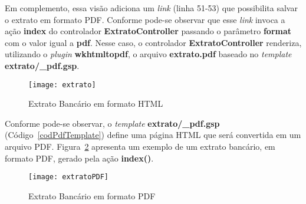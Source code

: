 \vspace{0.2cm}

\noindent Em  complemento, essa visão adiciona  um {\it link}  (linha 51-53) que
possibilita salvar o extrato em  formato PDF. Conforme pode-se observar que esse
{\it  link} invoca  a ação  {\bf index}  do controlador  {\bf ExtratoController}
passando o parâmetro {\bf format} com o  valor igual a {\bf pdf}.  Nesse caso, o
controlador {\bf  ExtratoController} renderiza,  utilizando o {\it  plugin} {\bf
  wkhtmltopdf},  o arquivo  {\bf  extrato.pdf} baseado  no  {\it template}  {\bf
  extrato/\_pdf.gsp}.

\begin{figure}[htbp]
\centering\texttt{[image: extrato]}
\caption{Extrato Bancário em formato HTML}
\label{figExtratoHTML}
\end{figure}

Conforme   pode-se   observar,   o   {\it  template}   {\bf   extrato/\_pdf.gsp}
(Código~\ref{codPdfTemplate}) define  uma página HTML que será  convertida em um
arquivo  PDF.  Figura~\ref{figExtratoPDF}  apresenta  um exemplo  de um  extrato
bancário, em formato PDF, gerado pela ação {\bf index()}.

\begin{figure}[h]
\centering\texttt{[image: extratoPDF]}
\caption{Extrato Bancário em formato PDF}
\label{figExtratoPDF}
\end{figure}

\newpage

